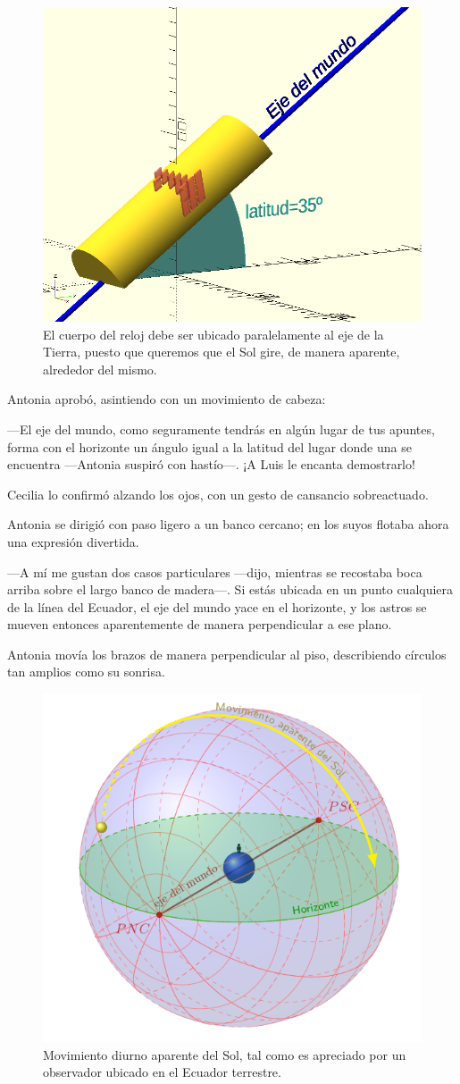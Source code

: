 \begin{figure}[ht]
  \centering
  \includegraphics[width=.45\textwidth]{imagenes/inclinacion-reloj}  
  \caption[Inclinación del reloj.]{El cuerpo del reloj debe ser
    ubicado paralelamente al eje de la Tierra, puesto que queremos que
    el Sol gire, de manera aparente, alrededor del mismo.}
  \label{fig:inclinacion-reloj}
\end{figure}

Antonia aprobó, asintiendo con un movimiento de cabeza:

---El eje del mundo, como seguramente tendrás en algún lugar de tus
apuntes, forma con el horizonte un ángulo igual a la latitud del lugar
donde una se encuentra ---Antonia suspiró con hastío---. ¡A Luis le
encanta demostrarlo!

Cecilia lo confirmó alzando los ojos, con un gesto de cansancio
sobreactuado.

Antonia se dirigió con paso ligero a un banco cercano; en los suyos
flotaba ahora una expresión divertida.

---A mí me gustan dos casos particulares ---dijo, mientras se
recostaba boca arriba sobre el largo banco de ma\-de\-ra---. Si estás
ubicada en un punto cualquiera de la línea del Ecuador, el eje del
mundo yace en el horizonte, y los astros se mueven entonces
aparentemente de manera perpendicular a ese plano.


Antonia movía los brazos de manera perpendicular al piso, describiendo
círculos tan amplios como su sonrisa.


\begin{figure}[ht]
  \centering
  \includegraphics[width=.44\textwidth]{imagenes/movimiento-aparente-solar-ecuador}
  \caption{Movimiento diurno aparente del Sol, tal como es apreciado
    por un observador ubicado en el Ecuador terrestre.}
  \label{fig:mov-ap-ec}
\end{figure}




